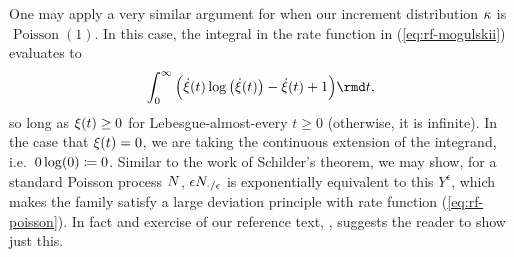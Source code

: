 \begin{example}[Poisson]
  One may apply a very similar argument for when our increment distribution $\kappa$ is $\operatorname{Poisson}(1)$.
  In this case, the integral in the rate function in (\ref{eq:rf-mogulskii}) evaluates to
  \begin{equation}
    \label{eq:rf-poisson}
    \int_0^\infty \Big( \dot\pathVar(t)  \log\big(\dot\pathVar(t)\big) - \dot\pathVar(t) + 1 \Big) \rmd t,
  \end{equation}
  so long as $\xi(t) \geq 0$ for Lebesgue-almost-every $t \geq 0$ (otherwise, it is infinite).
  In the case that $\xi(t) = 0$, we are taking the continuous extension of the integrand, i.e.\ $0\log(0) \coloneqq 0$.
  Similar to the work of Schilder's theorem, we may show, for a standard Poisson process $N$, $\epsilon N_{\cdot/\epsilon}$ is exponentially equivalent to this $Y^\epsilon$, which makes the family satisfy a large deviation principle with rate function (\ref{eq:rf-poisson}).
  In fact and exercise of our reference text, \cite[Exercise 5.2.12]{dembo2010}, suggests the reader to show just this.


\end{example}
